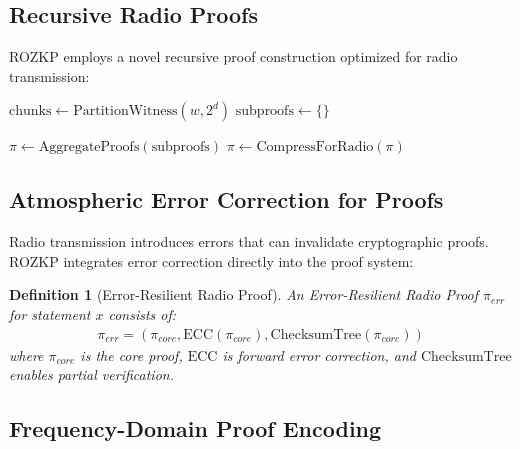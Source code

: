 \documentclass[11pt,a4paper]{article}
\newtheorem{definition}[theorem]{Definition}
\begin{document}
\subsection{Recursive Radio Proofs}

ROZKP employs a novel recursive proof construction optimized for radio transmission:

\begin{algorithm}[H]
\SetAlgoLined
{}
\caption{Recursive Radio Proof Generation}


$\text{chunks} \leftarrow \text{PartitionWitness}(w, 2^d)$\;
$\text{subproofs} \leftarrow \{\}$\;


$\pi \leftarrow \text{AggregateProofs}(\text{subproofs})$\;
$\pi \leftarrow \text{CompressForRadio}(\pi)$\;
\Return{$\pi$}\;
\end{algorithm}

\subsection{Atmospheric Error Correction for Proofs}

Radio transmission introduces errors that can invalidate cryptographic proofs. ROZKP integrates error correction directly into the proof system:

\begin{definition}[Error-Resilient Radio Proof]
An Error-Resilient Radio Proof $\pi_{err}$ for statement $x$ consists of:
\begin{align}
\pi_{err} = (\pi_{core}, \text{ECC}(\pi_{core}), \text{ChecksumTree}(\pi_{core}))
\end{align}
where $\pi_{core}$ is the core proof, $\text{ECC}$ is forward error correction, and $\text{ChecksumTree}$ enables partial verification.
\end{definition}

\subsection{Frequency-Domain Proof Encoding}
\end{document}
